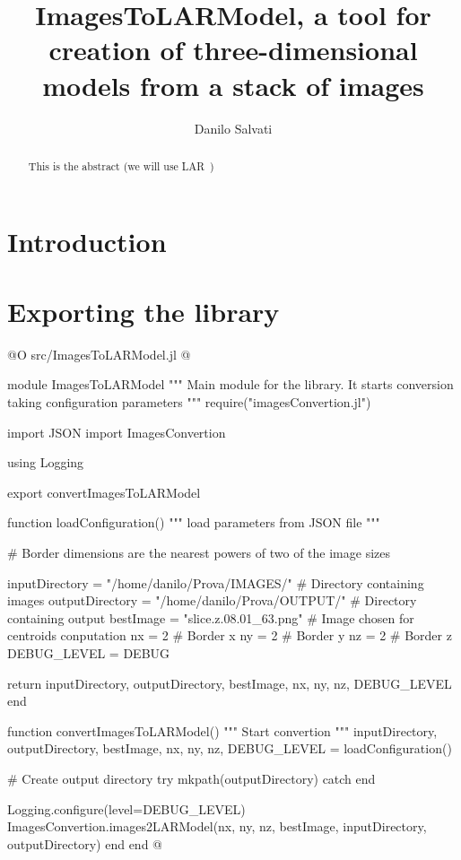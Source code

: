 \documentclass[11pt,oneside]{article}	%
\title{ImagesToLARModel, a tool for creation of three-dimensional models from a stack of images}
\author{Danilo Salvati}
\begin{document}
\maketitle

\begin{abstract}
This is the abstract (we will use LAR~\cite{cclar-proj:2013:00})

\end{abstract}

\newpage
\tableofcontents
\newpage

\section{Introduction}\label{sec:intro}

\section{Exporting the library}

@O src/ImagesToLARModel.jl
@{module ImagesToLARModel
"""
Main module for the library. It starts conversion
taking configuration parameters
"""
require("imagesConvertion.jl")

import JSON
import ImagesConvertion

using Logging

export convertImagesToLARModel

function loadConfiguration()
  """
  load parameters from JSON file
  """

  # Border dimensions are the nearest powers of two of the image sizes

  inputDirectory = "/home/danilo/Prova/IMAGES/" # Directory containing images
  outputDirectory = "/home/danilo/Prova/OUTPUT/" # Directory containing output
  bestImage = "slice.z.08.01_63.png" # Image chosen for centroids conputation
  nx = 2 # Border x
  ny = 2 # Border y
  nz = 2 # Border z
  DEBUG_LEVEL = DEBUG

  return inputDirectory, outputDirectory, bestImage, nx, ny, nz, DEBUG_LEVEL
end

function convertImagesToLARModel()
  """
  Start convertion
  """
  inputDirectory, outputDirectory, bestImage, nx, ny, nz, DEBUG_LEVEL = loadConfiguration()

  # Create output directory
  try
    mkpath(outputDirectory)
  catch
  end

  Logging.configure(level=DEBUG_LEVEL)
  ImagesConvertion.images2LARModel(nx, ny, nz, bestImage, inputDirectory, outputDirectory)
end
end
@}
\end{document}
